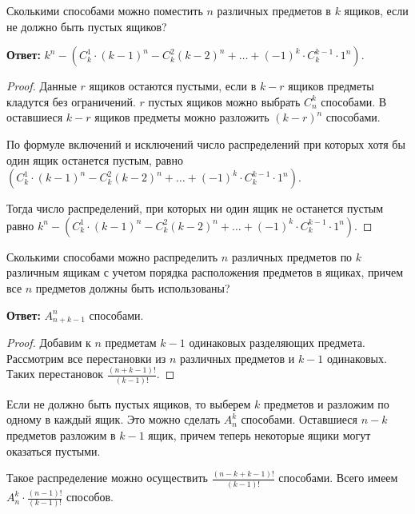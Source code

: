 \begin{theorem}
    Сколькими способами можно поместить $n$ различных предметов в $k$ ящиков, если
не должно быть пустых ящиков? 

\textbf{Ответ:} $k^n - (C^1_k \cdot (k - 1)^n - C_k^2 (k - 2)^n + \dots + (-1)^k \cdot C_k^{k - 1} \cdot 1^n)$.

\begin{proof}
    Данные $r$ ящиков остаются пустыми, если в $k - r$ ящиков предметы
    кладутся без ограничений. $r$ пустых ящиков можно выбрать $C_n^k$ способами.
    В оставшиеся $k - r$ ящиков предметы можно разложить $(k - r)^n$ способами.

    По формуле включений и исключений число распределений при которых
    хотя бы один ящик останется пустым, равно $(C^1_k \cdot (k - 1)^n - C_k^2 (k - 2)^n + \dots + (-1)^k \cdot C_k^{k - 1} \cdot 1^n)$.

    Тогда число распределений, при которых ни один ящик не останется пустым равно
    $k^n - (C^1_k \cdot (k - 1)^n - C_k^2 (k - 2)^n + \dots + (-1)^k \cdot C_k^{k - 1} \cdot 1^n)$.
\end{proof}
\end{theorem}

\begin{theorem}
    Сколькими способами можно распределить $n$ различных предметов по $k$ различным
ящикам с учетом порядка расположения предметов в ящиках, причем все $n$ предметов
должны быть использованы? 

\textbf{Ответ:} $A_{n + k - 1}^n$ способами.

\begin{proof}
    Добавим к $n$ предметам $k - 1$ одинаковых разделяющих предмета.
    Рассмотрим все перестановки из $n$ различных предметов и $k - 1$ одинаковых.
    Таких перестановок $\displaystyle \frac{(n + k - 1)!}{(k - 1)!}$.
\end{proof}
\end{theorem}

\begin{corollary}
    Если не должно быть пустых ящиков, то выберем $k$ предметов и разложим по
одному в каждый ящик. Это можно сделать $A_n^k$ способами. Оставшиеся $n-k$ предметов
разложим в $k-1$ ящик, причем теперь некоторые ящики могут оказаться пустыми.

Такое распределение можно осуществить $\displaystyle \frac{(n - k + k - 1)!}{(k - 1)!}$ способами. Всего
имеем $\displaystyle A_n^k \cdot \frac{(n - 1)!}{(k - 1)!}$ способов.
\end{corollary}

